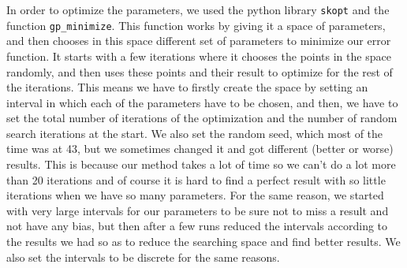 \documentclass[main.tex]{subfiles}
\begin{document}
In order to optimize the parameters, we used the python library \texttt{skopt} and the function \texttt{gp\_minimize}. This function works by giving it a space of parameters, and then chooses in this space different set of parameters to minimize our error function. It starts with a few iterations where it chooses the points in the space randomly, and then uses these points and their result to optimize for the rest of the iterations. This means we have to firstly create the space by setting an interval in which each of the parameters have to be chosen, and then, we have to set the total number of iterations of the optimization and the number of random search iterations at the start. We also set the random seed, which most of the time was at 43, but we sometimes changed it and got different (better or worse) results. This is because our method takes a lot of time so we can't do a lot more than 20 iterations and of course it is hard to find a perfect result with so little iterations when we have so many parameters. For the same reason, we started with very large intervals for our parameters to be sure not to miss a result and not have any bias, but then after a few runs reduced the intervals according to the results we had so as to reduce the searching space and find better results. We also set the intervals to be discrete for the same reasons.
\end{document}
